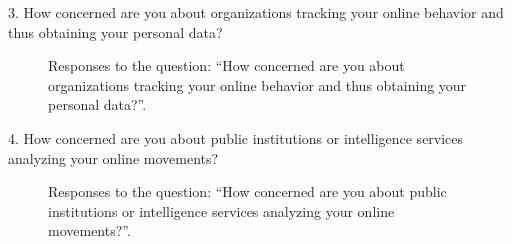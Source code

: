 3. How concerned are you about organizations tracking your online behavior and thus obtaining your personal data?

\begin{figure}[H]
    \begin{center}
        \caption{Responses to the question: ``How concerned are you about organizations tracking your online behavior and thus obtaining your personal data?''.}
        \label{fig:survey_s3_q3}
    \end{center}
\end{figure}

4. How concerned are you about public institutions or intelligence services analyzing your online movements?

\begin{figure}[H]
    \begin{center}
        \caption{Responses to the question: ``How concerned are you about public institutions or intelligence services analyzing your online movements?''.}
        \label{fig:survey_s3_q4}
    \end{center}
\end{figure}

